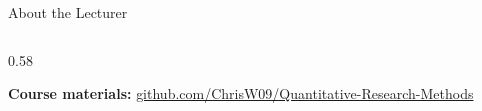{\begin{frame}{About the Lecturer}
\begin{columns}[c]
\begin{column}{0.58\textwidth}
\begin{itemize}
        \end{itemize}

        \vspace{0.3em}

        \small
        \textbf{Course materials:}
        \href{https://github.com/ChrisW09/Quantitative-Research-Methods}{\textcolor{hsbiblau}{github.com/ChrisW09/Quantitative-Research-Methods}}

    \end{column}

\end{columns}
\end{frame}}

\newcommand{\cpart}[2]{%
  \ifnum\currentpart=#1\relax
    \textcolor{hsbiblau}{\textbf{#2}}%
  \else
    #2%
  \fi}
